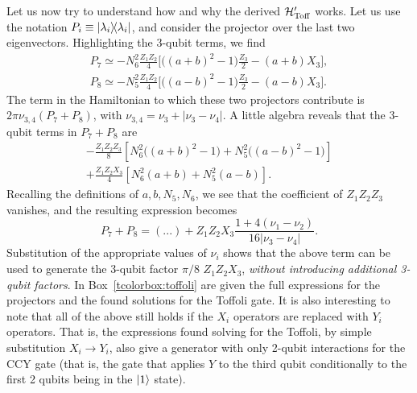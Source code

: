 Let us now try to understand how and why the derived ${\mathcal{H}}'_{\operatorname{Toff}}{}$ works.
Let us use the notation $P_i \equiv \ketbra{\lambda_i}$,
and consider the projector over the last two eigenvectors.
Highlighting the 3-qubit terms, we find
\begin{equation}
\begin{aligned}
	P_7 \simeq - N_6^2 \frac{Z_1 Z_2}{4} \bigg[
		\big((a + b)^2 - 1\big) \frac{Z_3}{2}
		- (a + b) X_3
	\bigg], \\
	P_8 \simeq - N_5^2 \frac{Z_1 Z_2}{4} \bigg[
		\big((a - b)^2 - 1\big) \frac{Z_3}{2}
		- (a - b) X_3
	\bigg].
\end{aligned}
\end{equation}
The term in the Hamiltonian to which these two projectors contribute is
$2\pi \nu_{3,4} (P_7 + P_8)$, with $\nu_{3,4} = \nu_3 + \lvert \nu_3 - \nu_4\rvert$.
A little algebra reveals that the 3-qubit terms in $P_7 + P_8$ are
\begin{equation}
\begin{aligned}
	- \frac{Z_1 Z_2 Z_3}{8} \left[
		N_6^2\big((a+b)^2 - 1\big)
		+ N_5^2 \big((a-b)^2 - 1\big)
	\right] \\
	+ \frac{Z_1 Z_2 X_3}{4} \left[
		N_6^2(a+b) + N_5^2(a-b)
	\right].
\end{aligned}
\end{equation}
Recalling the definitions of $a,b,N_5,N_6$, we see that the coefficient of $Z_1 Z_2 Z_3$ vanishes, and the resulting expression becomes
\begin{equation}
	P_7 + P_8 = (...) +
	Z_1 Z_2 X_3 \frac{1 + 4(\nu_1 - \nu_2)}{16\lvert \nu_3 - \nu_4\rvert}.
\end{equation}
Substitution of the appropriate values of $\nu_i$ shows that the above term can be used to generate the 3-qubit factor $\pi/8 \,\,Z_1 Z_2 X_3$,
\emph{without introducing additional 3-qubit factors}.
In Box~\ref{tcolorbox:toffoli} are given the full expressions for the projectors and the found solutions for the Toffoli gate.
It is also interesting to note that all of the above still holds if the $X_i$ operators are replaced with $Y_i$ operators.
That is, the expressions found solving for the Toffoli, by simple substitution $X_i \to Y_i$,
also give a generator with only 2-qubit interactions for the CCY gate
(that is, the gate that applies $Y$ to the third qubit conditionally to the first 2 qubits being in the $\ket1$ state).

